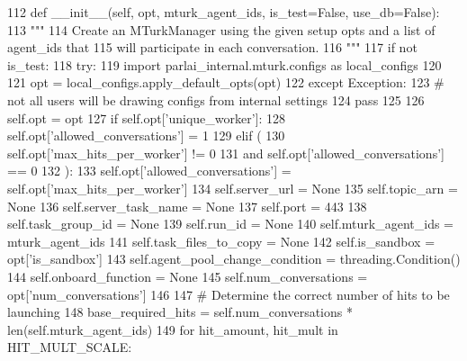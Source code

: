 \begin{DoxyCode}
112     \textcolor{keyword}{def }\_\_init\_\_(self, opt, mturk\_agent\_ids, is\_test=False, use\_db=False):
113         \textcolor{stringliteral}{"""}
114 \textcolor{stringliteral}{        Create an MTurkManager using the given setup opts and a list of agent\_ids that}
115 \textcolor{stringliteral}{        will participate in each conversation.}
116 \textcolor{stringliteral}{        """}
117         \textcolor{keywordflow}{if} \textcolor{keywordflow}{not} is\_test:
118             \textcolor{keywordflow}{try}:
119                 \textcolor{keyword}{import} parlai\_internal.mturk.configs \textcolor{keyword}{as} local\_configs
120 
121                 opt = local\_configs.apply\_default\_opts(opt)
122             \textcolor{keywordflow}{except} Exception:
123                 \textcolor{comment}{# not all users will be drawing configs from internal settings}
124                 \textcolor{keywordflow}{pass}
125 
126         self.opt = opt
127         \textcolor{keywordflow}{if} self.opt[\textcolor{stringliteral}{'unique\_worker'}]:
128             self.opt[\textcolor{stringliteral}{'allowed\_conversations'}] = 1
129         \textcolor{keywordflow}{elif} (
130             self.opt[\textcolor{stringliteral}{'max\_hits\_per\_worker'}] != 0
131             \textcolor{keywordflow}{and} self.opt[\textcolor{stringliteral}{'allowed\_conversations'}] == 0
132         ):
133             self.opt[\textcolor{stringliteral}{'allowed\_conversations'}] = self.opt[\textcolor{stringliteral}{'max\_hits\_per\_worker'}]
134         self.server\_url = \textcolor{keywordtype}{None}
135         self.topic\_arn = \textcolor{keywordtype}{None}
136         self.server\_task\_name = \textcolor{keywordtype}{None}
137         self.port = 443
138         self.task\_group\_id = \textcolor{keywordtype}{None}
139         self.run\_id = \textcolor{keywordtype}{None}
140         self.mturk\_agent\_ids = mturk\_agent\_ids
141         self.task\_files\_to\_copy = \textcolor{keywordtype}{None}
142         self.is\_sandbox = opt[\textcolor{stringliteral}{'is\_sandbox'}]
143         self.agent\_pool\_change\_condition = threading.Condition()
144         self.onboard\_function = \textcolor{keywordtype}{None}
145         self.num\_conversations = opt[\textcolor{stringliteral}{'num\_conversations'}]
146 
147         \textcolor{comment}{# Determine the correct number of hits to be launching}
148         base\_required\_hits = self.num\_conversations * len(self.mturk\_agent\_ids)
149         \textcolor{keywordflow}{for} hit\_amount, hit\_mult \textcolor{keywordflow}{in} HIT\_MULT\_SCALE:

\end{DoxyCode}
